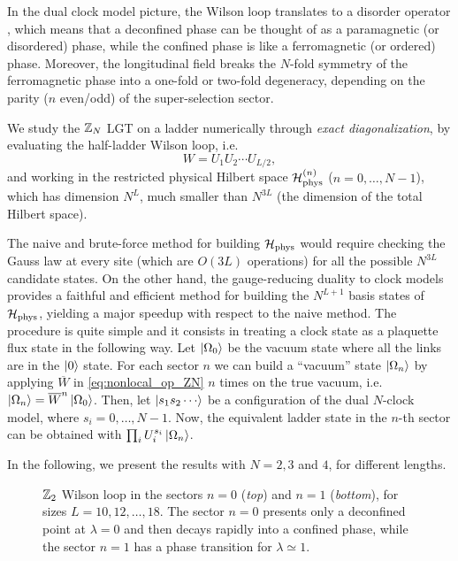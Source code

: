 In the dual clock model picture, the Wilson loop translates to a disorder operator \cite{fradkin1978order}, which means that a deconfined phase can be thought of as a paramagnetic (or disordered) phase, while the confined phase is like a ferromagnetic (or ordered) phase.
Moreover, the longitudinal field breaks the $N$-fold symmetry of the ferromagnetic phase into a one-fold or two-fold degeneracy, depending on the parity ($n$ even/odd) of the super-selection sector.

We study the $\mathbb{Z}_N$ LGT on a ladder numerically through \emph{exact diagonalization}, by evaluating the half-ladder Wilson loop, i.e.~
\begin{equation}
    W = U_1 U_2 \cdots U_{L/2},
\end{equation}
and working in the restricted physical Hilbert space $\mathcal{H}_{\text{phys}}^{(n)}$ ($n=0,\dots,N-1$), which has dimension $N^L$, much smaller than $N^{3L}$ (the dimension of the total Hilbert space).

The naive and brute-force method for building $\mathcal{H}_{\text{phys}}$ would require checking the Gauss law at every site (which are $O(3L)$ operations) for all the possible $N^{3L}$ candidate states.
On the other hand, the gauge-reducing duality to clock models provides a faithful and efficient method for building the $N^{L+1}$ basis states of $\mathcal{H}_{\text{phys}}$, yielding a major speedup with respect to the naive method.
The procedure is quite simple and it consists in treating a clock state as a plaquette flux state in the following way.
Let $\ket{\Omega_0}$ be the vacuum state where all the links are in the $\ket{0}$ state.
For each sector $n$ we can build a ``vacuum'' state $\ket{\Omega_n}$ by applying $\overline{W}$ in \eqref{eq:nonlocal_op_ZN} $n$ times on the true vacuum, i.e.~$\ket{\Omega_n} = \overline{W}^{n} \ket{\Omega_0}$.
Then, let $\ket{s_1 s_2 \cdots}$ be a configuration of the dual $N$-clock model, where $s_i = 0, \dots, N-1$.
Now, the equivalent ladder state in the $n$-th sector can be obtained with $\prod_{i} U_i^{s_i} \ket{\Omega_n}$.

In the following, we present the results with $N=2,3$ and $4$, for different lengths.



\begin{figure}[t]
    \centering
    
    \vspace*{-10pt}
    \caption{$\mathbb{Z}_2$ Wilson loop in the sectors $n=0$ (\emph{top}) and $n=1$ (\emph{bottom}), for sizes $L=10,12, \dots,18$.
    The sector $n=0$ presents only a deconfined point at $\lambda=0$ and then decays rapidly into a confined phase, while the sector $n=1$ has a phase transition for $\lambda \simeq 1$.
    }
    \label{fig:z2_wilson}
\end{figure}

